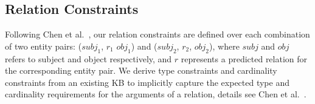 

\subsection{Relation Constraints}
\label{sec:constraints}



Following Chen et al.~, our relation constraints are defined over each combination of two entity pairs: ($subj_1$, $r_1$ $obj_1$) and ($subj_2$,  $r_2$, $obj_2$),
where $subj$ and $obj$ refers to subject and object respectively, and $r$ represents a predicted relation for the corresponding entity pair.
We derive type constraints and cardinality constraints from an existing KB to implicitly capture the expected type and cardinality requirements for the arguments of a relation, 
details see Chen et al.~. 
